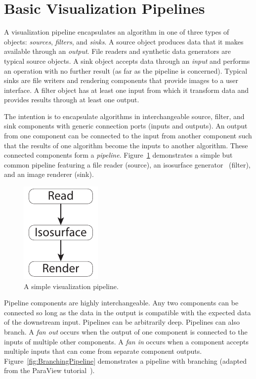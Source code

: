 \documentclass{article}
\newcommand*{\lcite}[1]{~\cite{#1}}
\newcommand*{\keyterm}[1]{\emph{#1}}
\begin{document}
\section{Basic Visualization Pipelines}
\label{sec:BasicVisualizationPipelines}

A visualization pipeline encapsulates an algorithm in one of three types of
objects: \keyterm{sources}, \keyterm{filters}, and \keyterm{sinks}.  A
source object produces data that it makes available through an
\keyterm{output}.  File readers and synthetic data generators are typical
source objects.  A sink object accepts data through an \keyterm{input} and
performs an operation with no further result (as far as the pipeline is
concerned).  Typical sinks are file writers and rendering components that
provide images to a user interface.  A filter object has at least one input
from which it transform data and provides results through at least one
output.

The intention is to encapsulate algorithms in interchangeable source,
filter, and sink components with generic connection ports (inputs and
outputs).  An output from one component can be connected to the input from
another component such that the results of one algorithm become the inputs
to another algorithm.  These connected components form a
\keyterm{pipeline}.  Figure~\ref{fig:SimplePipeline} demonstrates a simple
but common pipeline featuring a file reader (source), an isosurface
generator\lcite{Lorensen1987} (filter), and an image renderer (sink).

\begin{figure}[htbp]
  \centering
  \includegraphics{images/SimplePipeline}
  \caption{A simple visualization pipeline.}
  \label{fig:SimplePipeline}
\end{figure}

Pipeline components are highly interchangeable.  Any two components can be
connected so long as the data in the output is compatible with the expected
data of the downstream input.  Pipelines can be arbitrarily deep.
Pipelines can also branch.  A \keyterm{fan out} occurs when the output of
one component is connected to the inputs of multiple other components.  A
\keyterm{fan in} occurs when a component accepts multiple inputs that can
come from separate component outputs.  Figure~\ref{fig:BranchingPipeline}
demonstrates a pipeline with branching (adapted from the ParaView
tutorial\lcite{ParaViewTutorial}).
\end{document}
